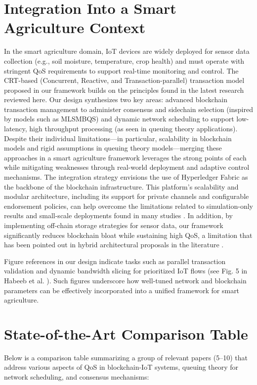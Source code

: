 \documentclass[12pt,onecolumn]{IEEEtran} %
\begin{document}
\section*{Integration Into a Smart Agriculture Context}
In the smart agriculture domain, IoT devices are widely deployed for sensor data collection (e.g., soil moisture, temperature, crop health) and must operate with stringent QoS requirements to support real-time monitoring and control. The CRT-based (Concurrent, Reactive, and Transaction-parallel) transaction model proposed in our framework builds on the principles found in the latest research reviewed here. Our design synthesizes two key areas: advanced blockchain transaction management to administer consensus and sidechain selection (inspired by models such as MLSMBQS) and dynamic network scheduling to support low-latency, high throughput processing (as seen in queuing theory applications). Despite their individual limitations---in particular, scalability in blockchain models and rigid assumptions in queuing theory models---merging these approaches in a smart agriculture framework leverages the strong points of each while mitigating weaknesses through real-world deployment and adaptive control mechanisms. The integration strategy envisions the use of Hyperledger Fabric as the backbone of the blockchain infrastructure. This platform's scalability and modular architecture, including its support for private channels and configurable endorsement policies, can help overcome the limitations related to simulation-only results and small-scale deployments found in many studies \cite{pajooh2022experimentalperformanceanalysis}. In addition, by implementing off-chain storage strategies for sensor data, our framework significantly reduces blockchain bloat while sustaining high QoS, a limitation that has been pointed out in hybrid architectural proposals in the literature \cite{haque2024ascalableblockchain}.

Figure references in our design indicate tasks such as parallel transaction validation and dynamic bandwidth slicing for prioritized IoT flows (see Fig. 5 in Habeeb et al. \cite{habeeb2022dynamicbandwidthslicing}). Such figures underscore how well-tuned network and blockchain parameters can be effectively incorporated into a unified framework for smart agriculture.

\section*{State-of-the-Art Comparison Table}
Below is a comparison table summarizing a group of relevant papers (5--10) that address various aspects of QoS in blockchain-IoT systems, queuing theory for network scheduling, and consensus mechanisms:
\end{document}
